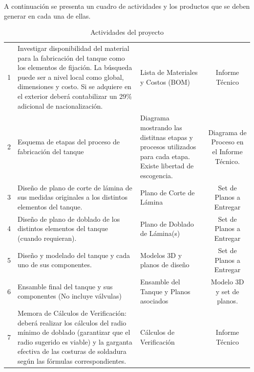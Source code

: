 \documentclass[10pt]{article}
\begin{document}
A continuación se presenta un cuadro de actividades y los productos que se deben generar en cada una de ellas.
\begin{table}[H]
    \renewcommand{\tabularxcolumn}[1]{m{#1}}
    \centering
    \caption{Actividades del proyecto}
    \label{tab:actividades}
    \begin{tabularx}{\textwidth}{|c|X|X|c|}
        \hline
        \rowcolor[HTML]{003B71}
        \color{white}\textbf{\strut Ítem} &
        \color{white}\textbf{\strut Actividad} &
        \color{white}\textbf{\strut Producto} &
        \color{white}\textbf{\strut Formato} \\
        \hline
        1 & Investigar disponibilidad del material para la fabricación del tanque como los elementos de fijación. La búsqueda puede ser a nivel local como global, dimensiones y costo. Si se adquiere en el exterior deberá contabilizar un 29\% adicional de nacionalización.   & Lista de Materiales y Costos (BOM) & Informe Técnico \\
        \hline
        2 & Esquema de etapas del proceso de fabricación del tanque& Diagrama mostrando las distitnas etapas y procesos utilizados para cada etapa. Existe libertad de escogencia.& Diagrama de Proceso en el Informe Técnico. \\
        \hline
        3 & Diseño de plano de corte de lámina de sus medidas originales a los distintos elementos del tanque. & Plano de Corte de Lámina & Set de Planos a Entregar \\
        \hline
        4 & Diseño de plano de doblado de los distintos elementos del tanque (cuando requieran). & Plano de Doblado de Lámina(s) & Set de Planos a Entregar \\
        \hline
        5 & Diseño y modelado del tanque y cada uno de sus componentes. & Modelos 3D y planos de diseño & Set de Planos a Entregar \\
        \hline
        6 & Ensamble final del tanque y sus componentes (No incluye válvulas) & Ensamble del Tanque y Planos asociados & Modelo 3D y set de planos. \\
        \hline
        7 & Memora de Cálculos de Verificación: deberá realizar los cálculos del radio mínimo de doblado (garantizar que el radio sugerido es viable) y la garganta efectiva de las costuras de soldadura según las fórmulas correspondientes. & Cálculos de Verificación & Informe Técnico \\
        \hline
    \end{tabularx}
\end{table}
\end{document}
